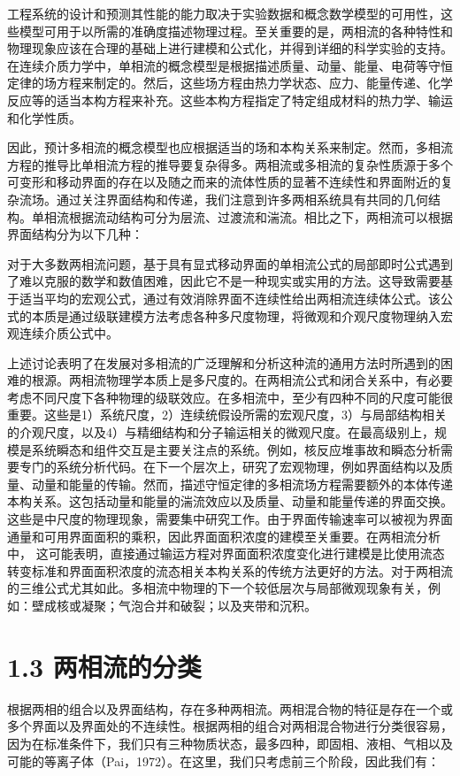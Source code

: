 \documentclass[11pt,a4paper,openany,fontset=none]{ctexbook}
\begin{document}
工程系统的设计和预测其性能的能力取决于实验数据和概念数学模型的可用性，这些模型可用于以所需的准确度描述物理过程。至关重要的是，两相流的各种特性和物理现象应该在合理的基础上进行建模和公式化，并得到详细的科学实验的支持。在连续介质力学中，单相流的概念模型是根据描述质量、动量、能量、电荷等守恒定律的场方程来制定的。然后，这些场方程由热力学状态、应力、能量传递、化学反应等的适当本构方程来补充。这些本构方程指定了特定组成材料的热力学、输运和化学性质。

因此，预计多相流的概念模型也应根据适当的场和本构关系来制定。然而，多相流方程的推导比单相流方程的推导要复杂得多。两相流或多相流的复杂性质源于多个可变形和移动界面的存在以及随之而来的流体性质的显著不连续性和界面附近的复杂流场。通过关注界面结构和传递，我们注意到许多两相系统具有共同的几何结构。单相流根据流动结构可分为层流、过渡流和湍流。相比之下，两相流可以根据界面结构分为以下几种：

对于大多数两相流问题，基于具有显式移动界面的单相流公式的局部即时公式遇到了难以克服的数学和数值困难，因此它不是一种现实或实用的方法。这导致需要基于适当平均的宏观公式，通过有效消除界面不连续性给出两相流连续体公式。该公式的本质是通过级联建模方法考虑各种多尺度物理，将微观和介观尺度物理纳入宏观连续介质公式中。

上述讨论表明了在发展对多相流的广泛理解和分析这种流的通用方法时所遇到的困难的根源。两相流物理学本质上是多尺度的。在两相流公式和闭合关系中，有必要考虑不同尺度下各种物理的级联效应。在多相流中，至少有四种不同的尺度可能很重要。这些是1）系统尺度，2）连续统假设所需的宏观尺度，3）与局部结构相关的介观尺度，以及4）与精细结构和分子输运相关的微观尺度。在最高级别上，规模是系统瞬态和组件交互是主要关注点的系统。例如，核反应堆事故和瞬态分析需要专门的系统分析代码。在下一个层次上，研究了宏观物理，例如界面结构以及质量、动量和能量的传输。然而，描述守恒定律的多相流场方程需要额外的本体传递本构关系。这包括动量和能量的湍流效应以及质量、动量和能量传递的界面交换。这些是中尺度的物理现象，需要集中研究工作。由于界面传输速率可以被视为界面通量和可用界面面积的乘积，因此界面面积浓度的建模至关重要。在两相流分析中，
这可能表明，直接通过输运方程对界面面积浓度变化进行建模是比使用流态转变标准和界面面积浓度的流态相关本构关系的传统方法更好的方法。对于两相流的三维公式尤其如此。多相流中物理的下一个较低层次与局部微观现象有关，例如：壁成核或凝聚；气泡合并和破裂；以及夹带和沉积。

\section*{1.3 两相流的分类}
根据两相的组合以及界面结构，存在多种两相流。两相混合物的特征是存在一个或多个界面以及界面处的不连续性。根据两相的组合对两相混合物进行分类很容易，因为在标准条件下，我们只有三种物质状态，最多四种，即固相、液相、气相以及可能的等离子体（Pai，1972）。在这里，我们只考虑前三个阶段，因此我们有：
\end{document}
